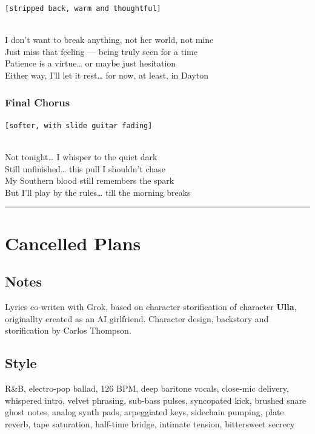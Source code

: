 \texttt{{[}stripped\ back,\ warm\ and\ thoughtful{]}}\strut \\
I don't want to break anything, not her world, not mine\\
Just miss that feeling --- being truly seen for a time\\
Patience is a virtue\ldots{} or maybe just hesitation\\
Either way, I'll let it rest\ldots{} for now, at least, in Dayton

\subsubsection{Final Chorus}\label{final-chorus-5}

\texttt{{[}softer,\ with\ slide\ guitar\ fading{]}}\strut \\
Not tonight\ldots{} I whisper to the quiet dark\\
Still unfinished\ldots{} this pull I shouldn't chase\\
My Southern blood still remembers the spark\\
But I'll play by the rules\ldots{} till the morning breaks

\begin{center}\rule{0.5\linewidth}{0.5pt}\end{center}

\section{Cancelled Plans}\label{cancelled-plans}

\subsection{Notes}\label{notes-41}

Lyrics co-writen with Grok, based on character storification of
character \textbf{Ulla}, originallty created as an AI girlfriend.
Character design, backstory and storification by Carlos Thompson.

\subsection{Style}\label{style-39}

R\&B, electro-pop ballad, 126 BPM, deep baritone vocals, close-mic
delivery, whispered intro, velvet phrasing, sub-bass pulses, syncopated
kick, brushed snare ghost notes, analog synth pads, arpeggiated keys,
sidechain pumping, plate reverb, tape saturation, half-time bridge,
intimate tension, bittersweet secrecy

